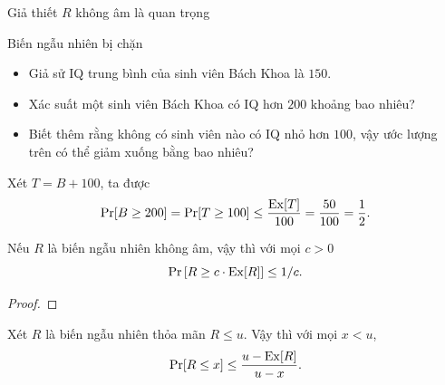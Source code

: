 \begin{frame}{Giả thiết $R$ không âm là quan trọng}
\end{frame}
\begin{frame}{Biến ngẫu nhiên bị chặn}
  \begin{itemize}
  \item<+-> Giả sử IQ trung bình của sinh viên Bách Khoa là $150$.
  \item<+-> Xác suất một sinh viên Bách Khoa có IQ hơn $200$ khoảng bao nhiêu?
    \action<+->{\[
        \pr[B \geq 200] \leq \frac{\ex[B]}{200} = \frac{150}{200} = \frac{3}{4}.  
      \]}
  \item<+-> Biết thêm rằng không có sinh viên nào có IQ nhỏ hơn $100$, vậy ước lượng trên có thể giảm xuống bằng bao nhiêu?
    
  \end{itemize}
\end{frame}

\begin{frame}
  Xét $T = B + 100$, ta được
  \[
    \mathrm{Pr}[B \geq 200] = \mathrm{Pr}[T \geq 100] \leq \frac{\mathrm{Ex}[T]}{100} = \frac{50}{100} = \frac{1}{2}.
  \]
\end{frame}

\begin{frame}
  \begin{crllr}
    Nếu $R$ là biến ngẫu nhiên \alert{không âm}, vậy thì với mọi $c > 0$
    \[
      \mathrm{Pr}\left[R \geq c\cdot \mathrm{Ex}[R]\right] \leq 1/c.
    \]
  \end{crllr}
  \begin{proof}
  \end{proof}
\end{frame}

\begin{frame}
  \begin{thrm}
    Xét $R$ là biến ngẫu nhiên thỏa mãn  $R\leq u$. Vậy thì với mọi $x < u$,
    \[
      \mathrm{Pr}[R \leq x] \leq \frac{u-\mathrm{Ex}[R]}{u-x}.
    \]
  \end{thrm}
\end{frame}

